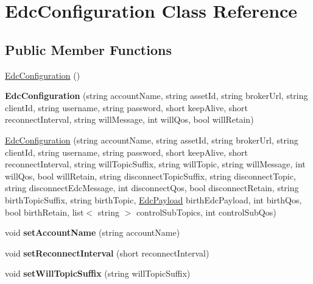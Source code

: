 \hypertarget{class_edc_configuration}{\section{Edc\-Configuration Class Reference}
\label{class_edc_configuration}
}
\subsection*{Public Member Functions}
\begin{DoxyCompactItemize}
\item 
\hyperlink{class_edc_configuration_a0ffbc1f97f9a194215009c9f2234e69b}{Edc\-Configuration} ()
\item 
\hypertarget{class_edc_configuration_ac75911b17b73af6bd7873fd95464a9b5}{{\bfseries Edc\-Configuration} (string account\-Name, string asset\-Id, string broker\-Url, string client\-Id, string username, string password, short keep\-Alive, short reconnect\-Interval, string will\-Message, int will\-Qos, bool will\-Retain)}\label{class_edc_configuration_ac75911b17b73af6bd7873fd95464a9b5}

\item 
\hyperlink{class_edc_configuration_a188ea27aed1e6eaed7a44ac95c52b6be}{Edc\-Configuration} (string account\-Name, string asset\-Id, string broker\-Url, string client\-Id, string username, string password, short keep\-Alive, short reconnect\-Interval, string will\-Topic\-Suffix, string will\-Topic, string will\-Message, int will\-Qos, bool will\-Retain, string disconnect\-Topic\-Suffix, string disconnect\-Topic, string disconnect\-Edc\-Message, int disconnect\-Qos, bool disconnect\-Retain, string birth\-Topic\-Suffix, string birth\-Topic, \hyperlink{classedcdatatypes_1_1_edc_payload}{Edc\-Payload} birth\-Edc\-Payload, int birth\-Qos, bool birth\-Retain, list$<$ string $>$ control\-Sub\-Topics, int control\-Sub\-Qos)
\item 
\hypertarget{class_edc_configuration_a27706dcfd99a95a90e068a7d57a0fbf3}{void {\bfseries set\-Account\-Name} (string account\-Name)}\label{class_edc_configuration_a27706dcfd99a95a90e068a7d57a0fbf3}

\item 
\hypertarget{class_edc_configuration_abc46d0113d79ff92c68e3ea6ca700fdb}{void {\bfseries set\-Reconnect\-Interval} (short reconnect\-Interval)}\label{class_edc_configuration_abc46d0113d79ff92c68e3ea6ca700fdb}

\item 
\hypertarget{class_edc_configuration_a5a72ab12e36767b292a43e6bb1bdeccd}{void {\bfseries set\-Will\-Topic\-Suffix} (string will\-Topic\-Suffix)}\label{class_edc_configuration_a5a72ab12e36767b292a43e6bb1bdeccd}


\end{DoxyCompactItemize}
